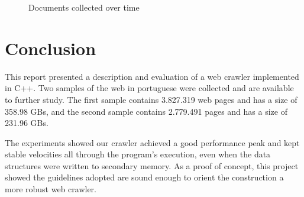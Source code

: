 \documentclass{report}
\begin{document}
\begin{figure}
\centering
{}
\caption{Documents collected over time}
\label{fig:documentsovertime}
\end{figure}

\chapter{Conclusion}

This report presented a description and evaluation of a web crawler implemented in C++. Two samples
of the web in portuguese were collected and are available to further study. The first sample contains
3.827.319 web pages and has a size of 358.98 GBs, and the second sample contains 2.779.491 pages and
has a size of 231.96 GBs. 

The experiments showed our crawler achieved a good performance peak and kept stable velocities all through the
program's execution, even when the data structures were written to secondary memory. As a proof of concept,
this project showed the guidelines adopted are sound enough to orient the construction a more robust web
crawler.
\end{document}
